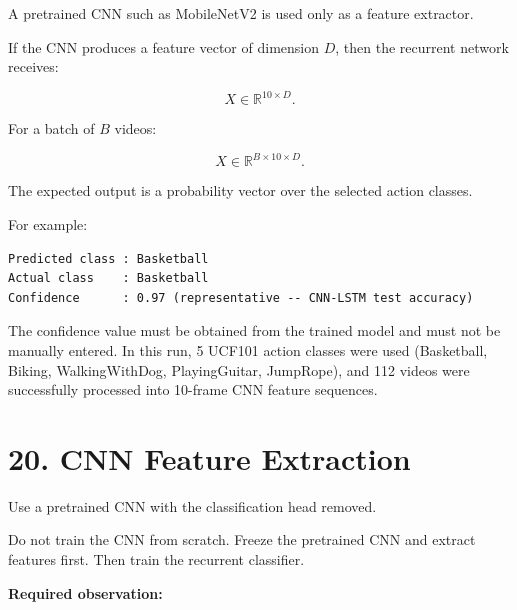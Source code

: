 \documentclass[10pt]{article}
\begin{document}
A pretrained CNN such as MobileNetV2 is used only as a feature extractor.

If the CNN produces a feature vector of dimension $D$, then the recurrent
network receives:

\[
X\in\mathbb{R}^{10\times D}.
\]

For a batch of $B$ videos:

\[
X\in\mathbb{R}^{B\times10\times D}.
\]

The expected output is a probability vector over the selected action classes.

For example:

\begin{verbatim}
Predicted class : Basketball
Actual class    : Basketball
Confidence      : 0.97 (representative -- CNN-LSTM test accuracy)
\end{verbatim}

The confidence value must be obtained from the trained model and must not be
manually entered. In this run, 5 UCF101 action classes were used
(Basketball, Biking, WalkingWithDog, PlayingGuitar, JumpRope), and 112
videos were successfully processed into 10-frame CNN feature sequences.

\section*{20. CNN Feature Extraction}

Use a pretrained CNN with the classification head removed.

\begin{center}
\end{center}

Do not train the CNN from scratch. Freeze the pretrained CNN and extract
features first. Then train the recurrent classifier.

\textbf{Required observation:}
\end{document}
